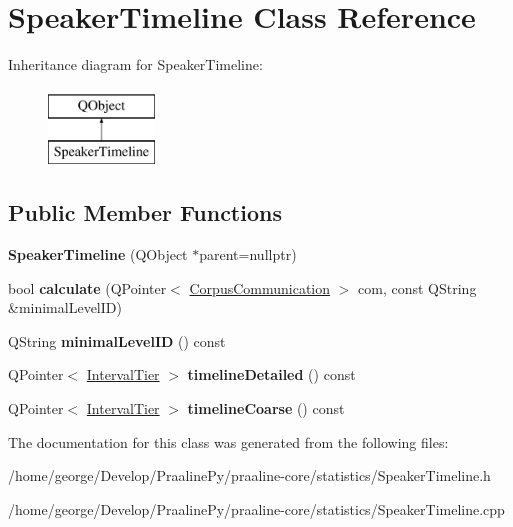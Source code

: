 \hypertarget{class_speaker_timeline}{}\section{Speaker\+Timeline Class Reference}
\label{class_speaker_timeline}
Inheritance diagram for Speaker\+Timeline\+:\begin{figure}[H]
\begin{center}
\leavevmode
\includegraphics[height=2.000000cm]{class_speaker_timeline}
\end{center}
\end{figure}
\subsection*{Public Member Functions}
\begin{DoxyCompactItemize}
\item 
\mbox{\label{class_speaker_timeline_acba9d49410636224f900a4f5d3fa175c}} 
{\bfseries Speaker\+Timeline} (Q\+Object $\ast$parent=nullptr)
\item 
\mbox{\label{class_speaker_timeline_a9b9e3d301e942e357fecada3848f3ae8}} 
bool {\bfseries calculate} (Q\+Pointer$<$ \hyperlink{class_corpus_communication}{Corpus\+Communication} $>$ com, const Q\+String \&minimal\+Level\+ID)
\item 
\mbox{\label{class_speaker_timeline_a8d8ce524aa4afc90d654efcc30a54bcc}} 
Q\+String {\bfseries minimal\+Level\+ID} () const
\item 
\mbox{\label{class_speaker_timeline_ae95ed23aa7c4586ad24081f4007ce914}} 
Q\+Pointer$<$ \hyperlink{class_interval_tier}{Interval\+Tier} $>$ {\bfseries timeline\+Detailed} () const
\item 
\mbox{\label{class_speaker_timeline_a23fe8d980b8f5c38981e5da704ec85bd}} 
Q\+Pointer$<$ \hyperlink{class_interval_tier}{Interval\+Tier} $>$ {\bfseries timeline\+Coarse} () const
\end{DoxyCompactItemize}


The documentation for this class was generated from the following files\+:\begin{DoxyCompactItemize}
\item 
/home/george/\+Develop/\+Praaline\+Py/praaline-\/core/statistics/Speaker\+Timeline.\+h\item 
/home/george/\+Develop/\+Praaline\+Py/praaline-\/core/statistics/Speaker\+Timeline.\+cpp\end{DoxyCompactItemize}
